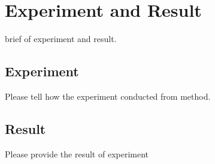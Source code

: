 \chapter{Experiment and Result}
brief of experiment and result.
\section{Experiment}
Please tell how the experiment conducted from method.

\section{Result}
Please provide the result of experiment